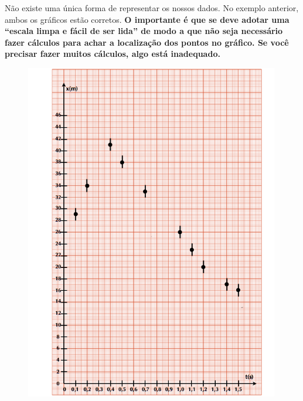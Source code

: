 Não existe uma única forma de representar os nossos dados.  No exemplo anterior, ambos os gráficos estão corretos. {\bf O importante é que se deve adotar uma “escala limpa e fácil de ser lida” de modo a que não seja necessário fazer cálculos para achar a localização dos pontos no gráfico. Se você precisar fazer muitos cálculos, algo está inadequado.}

\begin{figure}[t]
\vspace{0.5cm}
\begin{minipage}{\textwidth}
\begin{minipage}[t]{0.47\textwidth}
 \begin{center}
 \includegraphics*[width=0.99\textwidth]{fig/Plot1}
\end{center}
\end{minipage}
\begin{minipage}[t]{0.47\textwidth}
\begin{center}

\end{center}
\end{minipage}
\end{minipage}
\end{figure}
